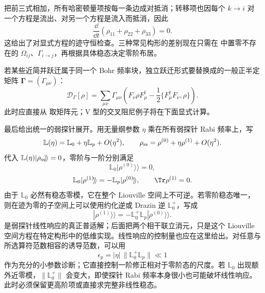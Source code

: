 把前三式相加，所有哈密顿量项按每一条边成对抵消；转移项也因每个 $k\to i$ 对一个方程是流出、对另一个方程是流入而抵消，因此
\[
\frac{\dd}{\dd t}(\rho_{11}+\rho_{22}+\rho_{33})=0.
\]
这给出了对显式方程的迹守恒检查。三种常见构形的差别现在只需在 中置零不存在的 $\Omega_{ij}$、$\Gamma_{i\to j}$，再根据具体稳态决定零阶布居。

若某些近简并跃迁属于同一个 Bohr 频率块，独立跃迁形式要替换成的一般正半定矩阵 $\boldsymbol\Gamma=(\Gamma_{\mu\nu})$：
\begin{equation}
\mathcal D_{\Gamma}[\rho]
=\sum_{\mu\nu}\Gamma_{\mu\nu}
\left(F_\nu\rho F_\mu^\dagger
-\frac12\{F_\mu^\dagger F_\nu,\rho\}\right).
\label{eq:phys-oqs-three-cross-damping}
\end{equation}
此时应直接从 取矩阵元；V 型的交叉阻尼例子将在下面显式计算。

最后给出统一的弱探针展开。用无量纲参数 $\eta$ 乘在所有弱探针 Rabi 频率上，写
\[
\mathbb L(\eta)=\mathbb L_0+\eta\mathbb L_p+O(\eta^2),
\qquad
\rho_{\rm ss}=\rho^{(0)}+\eta\rho^{(1)}+O(\eta^2).
\]
代入 $\mathbb L(\eta)|\rho_{\rm ss}\!\rangle\!\rangle=0$，零阶与一阶分别满足
\[
\mathbb L_0|\rho^{(0)}\!\rangle\!\rangle=0,
\]
\begin{equation}
\mathbb L_0|\rho^{(1)}\!\rangle\!\rangle
=-\mathbb L_p|\rho^{(0)}\!\rangle\!\rangle,
\qquad
\Tr\rho^{(1)}=0.
\label{eq:phys-oqs-three-linear-response}
\end{equation}
由于 $\mathbb L_0$ 必然有稳态零模，它在整个 Liouville 空间上不可逆。若零阶稳态唯一，则在迹为零的子空间上可以使用约化逆或 Drazin 逆 $\mathbb L_0^+$，写成
\begin{equation}
|\rho^{(1)}\!\rangle\!\rangle
=-\mathbb L_0^+\mathbb L_p|\rho^{(0)}\!\rangle\!\rangle.
\label{eq:phys-oqs-linear-response-pseudoinverse}
\end{equation}
 是弱探针线性响应的真正普适解；后面把两个相干联立消元，只是这个 Liouville 空间方程在特定构形中的低维实现。线性响应的控制量也应在这里给出。对任意与所选算符范数相容的诱导范数，可以用
\begin{equation}
\epsilon_p
=|\eta|\,\|\mathbb L_0^+\mathbb L_p\|
\ll1
\label{eq:phys-oqs-probe-small-parameter}
\end{equation}
作为充分的小参数诊断；它直接控制一阶修正相对于零阶态的尺度。若 $\mathbb L_0$ 出现额外近零模，$\|\mathbb L_0^+\|$ 会变大，即使探针 Rabi 频率本身很小也可能破坏线性响应。此时必须保留更高阶项或直接求完整非线性稳态。

